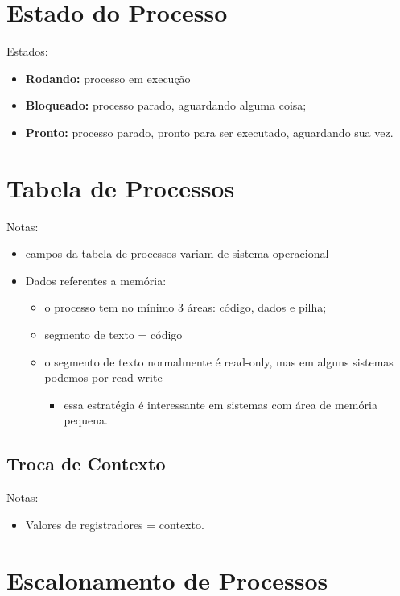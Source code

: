 \section{Estado do Processo}


Estados:
\begin{itemize}
  \item \textbf{Rodando:} processo em execução
  \item \textbf{Bloqueado:} processo parado, aguardando alguma coisa;
  \item \textbf{Pronto:} processo parado, pronto para ser executado, aguardando sua vez.
\end{itemize}


\section{Tabela de Processos}
Notas:
\begin{itemize}
  \item campos da tabela de processos variam de sistema operacional
  \item Dados referentes a memória:
  \begin{itemize}
    \item o processo tem no mínimo 3 áreas: código, dados e pilha;
    \item segmento de texto = código
    \item o segmento de texto normalmente é read-only, mas em alguns sistemas podemos por read-write
    \begin{itemize}
      \item essa estratégia é interessante em sistemas com área de memória pequena.
    \end{itemize}
  \end{itemize}
\end{itemize}

\subsection{Troca de Contexto}
Notas:
\begin{itemize}
  \item Valores de registradores = contexto.
\end{itemize}


\section{Escalonamento de Processos}


